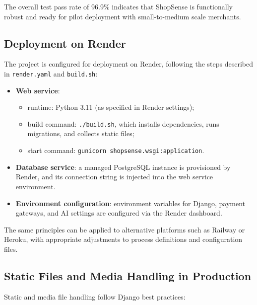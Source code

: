 The overall test pass rate of 96.9\% indicates that ShopSense is functionally robust and ready for pilot deployment with small-to-medium scale merchants.


\subsection{Deployment on Render}

The project is configured for deployment on Render, following the steps described in \texttt{render.yaml} and \texttt{build.sh}:

\begin{itemize}
  \item \textbf{Web service}:
  \begin{itemize}
    \item runtime: Python 3.11 (as specified in Render settings);
    \item build command: \texttt{./build.sh}, which installs dependencies, runs migrations, and collects static files;
    \item start command: \texttt{gunicorn shopsense.wsgi:application}.
  \end{itemize}
  \item \textbf{Database service}: a managed PostgreSQL instance is provisioned by Render, and its connection string is injected into the web service environment.
  \item \textbf{Environment configuration}: environment variables for Django, payment gateways, and AI settings are configured via the Render dashboard.
\end{itemize}

The same principles can be applied to alternative platforms such as Railway or Heroku, with appropriate adjustments to process definitions and configuration files.

\subsection{Static Files and Media Handling in Production}

Static and media file handling follow Django best practices:

